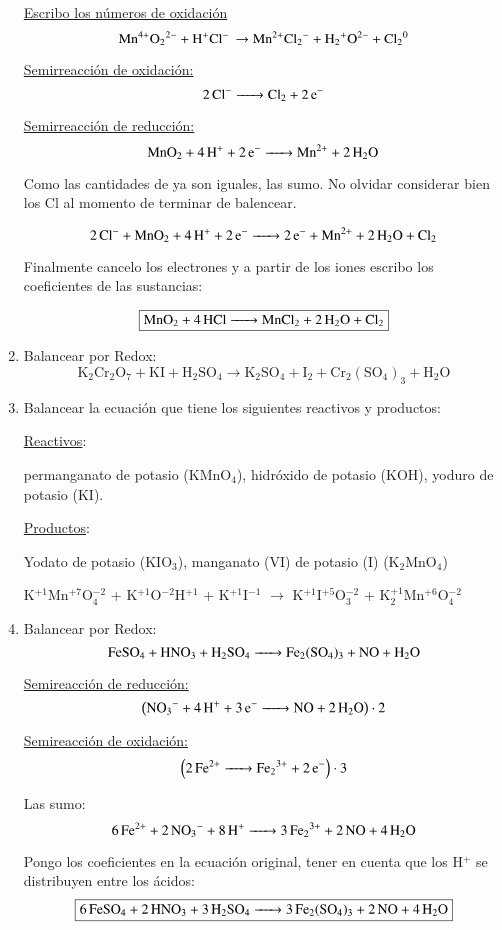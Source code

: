 \begin{enumerate}
\underline{Escribo los números de oxidación}
$$\ce{Mn^{4+}O_2^{2-} + H^{+}Cl^{-} \rightarrow Mn^{2+}Cl_2^{-} + H_2^+O^{2-} + Cl_2^{0}}$$

\begin{multicols}{2}
    \underline{Semirreacción de oxidación:}
    $$\ce{2Cl^- ->
    Cl_2 + 2e^-}$$
    
    \underline{Semirreacción de reducción:}
    $$\ce{MnO_2 + 4 H^+ + 2e^- ->
    Mn^{2+} + 2H_2O}$$
\end{multicols}

Como las cantidades de  ya son iguales, las sumo. No olvidar considerar bien los Cl al momento de terminar de balencear.

$$\ce{2 Cl^- + MnO_2 + 4H^+ + 2e^- -> 2e^- + Mn^{2+} + 2H_2O + Cl_2}$$

Finalmente cancelo los electrones y a partir de los iones escribo los coeficientes de las sustancias:

$$\fbox{\ce{MnO_2 + 4HCl -> MnCl_2 + 2H_2O + Cl_2}}$$


\item Balancear por Redox:
$$\text{K}_2\text{Cr}_2\text{O}_7 + \text{KI} + \text{H}_2\text{SO}_4 \longrightarrow \text{K}_2\text{SO}_4 + \text{I}_2 + \text{Cr}_2(\text{SO}_4)_3 + \text{H}_2\text{O}$$


\item Balancear la ecuación que tiene los siguientes reactivos y productos:

\underline{Reactivos}:

permanganato de potasio (KMnO$_4$), hidróxido de potasio (KOH), yoduro de potasio (KI).

\skipline
\underline{Productos}:

Yodato de potasio (KIO$_3$), manganato (VI) de potasio (I) (K$_2$MnO$_4$)

\skipline
{\large
\hfil
K$^{+1}$Mn$^{+7}$O$_4^{-2}$ \hfil+\hfil
K$^{+1}$O$^{-2}$H$^{+1}$ \hfil+\hfil
K$^{+1}$I$^{-1}$ \hfil$\longrightarrow$\hfil
K$^{+1}$I$^{+5}$O$_3^{-2}$ \hfil+\hfil
K$_2^{+1}$Mn$^{+6}$O$_4^{-2}$
\hfil
}


\item Balancear por Redox:
$$\ce{FeSO_4 + HNO_3 + H_2SO_4 -> Fe_2(SO4)3 + NO + H2O}$$

\begin{multicols}{2}
\underline{Semireacción de reducción:}
 $$\left(\ce{NO_3^- + 4H^+ + 3e^- -> NO + 2H_2O}\right)\cdot 2$$

\underline{Semireacción de oxidación:}
$$\left(\ce{ 2Fe^{2+} -> Fe_2^{3+} + 2e^-}  \right)\cdot 3$$
\end{multicols}

Las sumo:
$$
\ce{6Fe^{2+} + 2NO_3^- + 8H^+ -> 3Fe_2^{3+} + 2NO + 4H_2O}
$$

Pongo los coeficientes en la ecuación original, tener en cuenta que los H$^+$ se distribuyen entre los ácidos:
$$\fbox{\ce{6FeSO_4 + 2HNO_3 + 3H_2SO_4 -> 3Fe_2(SO4)3 + 2NO + 4H2O}}$$
\end{enumerate}
